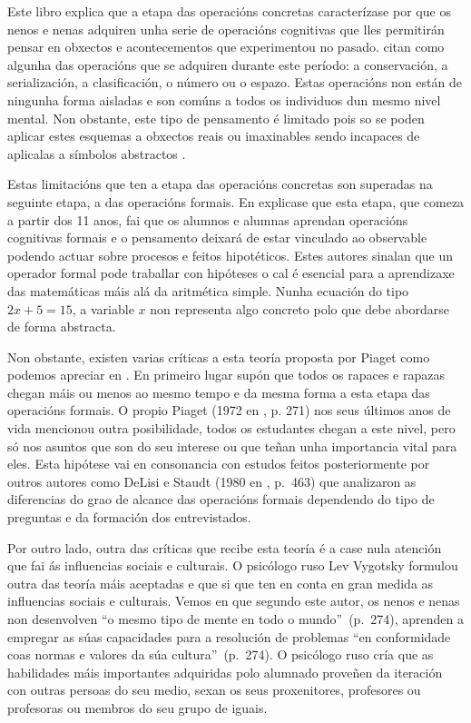 Este libro explica que a etapa das operacións concretas caracterízase por que os nenos e nenas adquiren unha serie de operacións cognitivas que lles permitirán pensar en obxectos e acontecementos que experimentou no pasado.  citan como algunha das operacións que se adquiren durante este período: a conservación, a serialización, a clasificación, o número ou o espazo. Estas operacións non están de ningunha forma aisladas e son comúns a todos os individuos dun mesmo nivel mental. Non obstante, este tipo de pensamento é limitado pois so se poden aplicar estes esquemas a obxectos reais ou imaxinables sendo incapaces de aplicalas a símbolos abstractos \cite{shaffer2000psicologia}.

Estas limitacións que ten a etapa das operacións concretas son superadas na seguinte etapa, a das operacións formais. En  explicase que esta etapa, que comeza a partir dos 11 anos, fai que os alumnos e alumnas aprendan operacións cognitivas formais e o pensamento deixará de estar vinculado ao observable podendo actuar sobre procesos e feitos hipotéticos. Estes autores sinalan que un operador formal pode traballar con hipóteses o cal é esencial para a aprendizaxe das matemáticas máis alá da aritmética simple. Nunha ecuación do tipo $2x + 5 = 15$, a variable $x$ non representa algo concreto polo que debe abordarse de forma abstracta.

Non obstante, existen varias críticas a esta teoría proposta por Piaget como podemos apreciar en . En primeiro lugar supón que todos os rapaces e rapazas chegan máis ou menos ao mesmo tempo e da mesma forma a esta etapa das operacións formais. O propio Piaget (1972 en , p. 271) nos seus últimos anos de vida mencionou outra posibilidade, todos os estudantes chegan a este nivel, pero só nos asuntos que son do seu interese ou que teñan unha importancia vital para eles. Esta hipótese vai en consonancia con estudos feitos posteriormente por outros autores como DeLisi e Staudt (1980 en , p.~463) que analizaron as diferencias do grao de alcance das operacións formais dependendo do tipo de preguntas e da formación dos entrevistados.

Por outro lado, outra das críticas que recibe esta teoría é a case nula atención que fai ás influencias sociais e culturais. O psicólogo ruso Lev Vygotsky formulou outra das teoría máis aceptadas e que si que ten en conta en gran medida as influencias sociais e culturais. Vemos en  que segundo este autor, os nenos e nenas non desenvolven ``o mesmo tipo de mente en todo o mundo''~(p.~274), aprenden a empregar as súas capacidades para a resolución de problemas ``en conformidade coas normas e valores da súa cultura''~(p.~274). O psicólogo ruso cría que as habilidades máis importantes adquiridas polo alumnado proveñen da iteración con outras persoas do seu medio, sexan os seus proxenitores, profesores ou profesoras ou membros do seu grupo de iguais.

